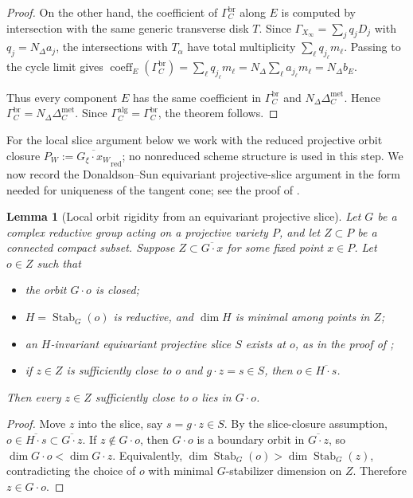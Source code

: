 \documentclass[11pt]{amsart}
\newtheorem{lemma}[theorem]{Lemma}
\theoremstyle{definition}
\theoremstyle{remark}
\begin{document}
\begin{proof}
On the other hand, the coefficient of $\Gamma_C^{\mathrm{br}}$ along $E$ is
computed by intersection with the same generic transverse disk $T$. Since
$\Gamma_{X_\infty}=\sum_j q_jD_j$ with $q_j=N_\Delta a_j$, the intersections
with $T_\alpha$ have total multiplicity
$\sum_\ell q_{j_\ell}m_\ell$. Passing to the cycle limit gives
$\operatorname{coeff}_E(\Gamma_C^{\mathrm{br}})
=\sum_\ell q_{j_\ell}m_\ell
=N_\Delta\sum_\ell a_{j_\ell}m_\ell
=N_\Delta b_E$.

Thus every component $E$ has the same coefficient in
$\Gamma_C^{\mathrm{br}}$ and $N_\Delta\Delta_C^{\mathrm{met}}$. Hence
$\Gamma_C^{\mathrm{br}}=N_\Delta\Delta_C^{\mathrm{met}}$. Since
$\Gamma_C^{\mathrm{alg}}=\Gamma_C^{\mathrm{br}}$, the theorem follows.
\end{proof}
For the local slice argument below we work with the reduced projective orbit
closure $P_W:=\overline{G_\xi\cdot x_W}_{\mathrm{red}}$; no nonreduced scheme
structure is used in this step.
We now record the Donaldson--Sun equivariant projective-slice argument in the
form needed for uniqueness of the tangent cone; see the proof of
\cite[Theorem~1.3]{DSII}.
\begin{lemma}[Local orbit rigidity from an equivariant projective slice]
Let $G$ be a complex reductive group acting on a projective variety $P$, and let
$Z\subset P$ be a connected compact subset. Suppose
$Z\subset\overline{G\cdot x}$ for some fixed point $x\in P$. Let $o\in Z$ such
that
\begin{itemize}
    \item the orbit $G\cdot o$ is closed;
    \item $H=\operatorname{Stab}_G(o)$ is reductive, and
    $\dim H$ is minimal among points in $Z$;
    \item an $H$-invariant equivariant projective slice $S$ exists at $o$, as in
    the proof of \cite[Theorem~1.3]{DSII};
    \item if $z\in Z$ is sufficiently close to $o$ and $g\cdot z=s\in S$, then
    $o\in\overline{H\cdot s}$.
\end{itemize}
Then every $z\in Z$ sufficiently close to $o$ lies in $G\cdot o$.
\end{lemma}

\begin{proof}
Move $z$ into the slice, say $s=g\cdot z\in S$. By the slice-closure
assumption, $o\in\overline{H\cdot s}\subset\overline{G\cdot z}$. If
$z\notin G\cdot o$, then $G\cdot o$ is a boundary orbit in
$\overline{G\cdot z}$, so $\dim G\cdot o<\dim G\cdot z$. Equivalently,
$\dim\operatorname{Stab}_G(o)>\dim\operatorname{Stab}_G(z)$, contradicting the
choice of $o$ with minimal $G$-stabilizer dimension on $Z$. Therefore
$z\in G\cdot o$.
\end{proof}
\end{document}
